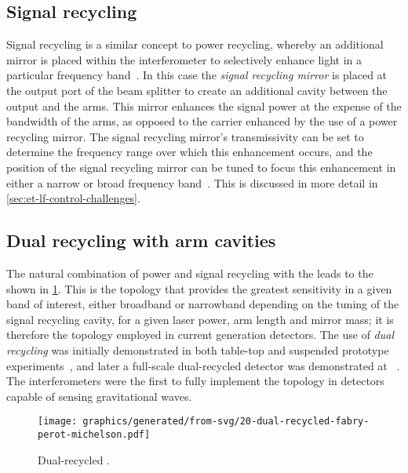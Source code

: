 \subsection{\label{sec:signal-recycling}Signal recycling}
Signal recycling is a similar concept to power recycling, whereby an additional mirror is placed within the interferometer to selectively enhance light in a particular frequency band~\cite{Meers1988}. In this case the \emph{signal recycling mirror} is placed at the output port of the beam splitter to create an additional cavity between the output and the arms. This mirror enhances the signal power at the expense of the bandwidth of the arms, as opposed to the carrier enhanced by the use of a power recycling mirror. The signal recycling mirror's transmissivity can be set to determine the frequency range over which this enhancement occurs, and the position of the signal recycling mirror can be tuned to focus this enhancement in either a narrow or broad frequency band~\cite{Buonanno2001}. This is discussed in more detail in \cref{sec:et-lf-control-challenges}.

\subsection{Dual recycling with \FP{} arm cavities}
The natural combination of power and signal recycling with the \FPMI{} leads to the \emph{\DRFPMI{}} shown in \cref{fig:drfpmi}. This is the topology that provides the greatest sensitivity in a given band of interest, either broadband or narrowband depending on the tuning of the signal recycling cavity, for a given laser power, arm length and mirror mass; it is therefore the topology employed in current generation detectors. The use of \emph{dual recycling} was initially demonstrated in both table-top and suspended prototype experiments~\cite{Strain1991, Heinzel1998, Freise2000}, and later a full-scale dual-recycled \MI{} detector was demonstrated at \GEO{}~\cite{Heinzel2002, Grote2004}. The \ALIGO{} interferometers were the first to fully implement the \DRFPMI{} topology in detectors capable of sensing gravitational waves.

\begin{figure}
  \centering
  \texttt{[image: graphics/generated/from-svg/20-dual-recycled-fabry-perot-michelson.pdf]}
  \caption[Dual-recycled \FPMI{}]{\label{fig:drfpmi}Dual-recycled \FPMI{}.}
\end{figure}

